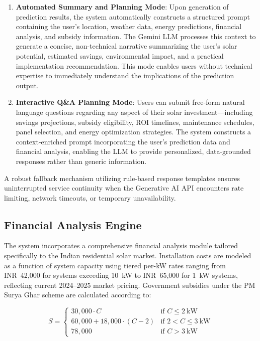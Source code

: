\documentclass[conference]{IEEEtran}
\begin{document}
\begin{enumerate}
\item \textbf{Automated Summary and Planning Mode}: Upon generation of prediction results, the system automatically constructs a structured prompt containing the user's location, weather data, energy predictions, financial analysis, and subsidy information. The Gemini LLM processes this context to generate a concise, non-technical narrative summarizing the user's solar potential, estimated savings, environmental impact, and a practical implementation recommendation. This mode enables users without technical expertise to immediately understand the implications of the prediction output.

\item \textbf{Interactive Q\&A Planning Mode}: Users can submit free-form natural language questions regarding any aspect of their solar investment---including savings projections, subsidy eligibility, ROI timelines, maintenance schedules, panel selection, and energy optimization strategies. The system constructs a context-enriched prompt incorporating the user's prediction data and financial analysis, enabling the LLM to provide personalized, data-grounded responses rather than generic information.
\end{enumerate}

A robust fallback mechanism utilizing rule-based response templates ensures uninterrupted service continuity when the Generative AI API encounters rate limiting, network timeouts, or temporary unavailability.

\subsection{Financial Analysis Engine}

The system incorporates a comprehensive financial analysis module tailored specifically to the Indian residential solar market. Installation costs are modeled as a function of system capacity using tiered per-kW rates ranging from INR~42,000 for systems exceeding 10~kW to INR~65,000 for 1~kW systems, reflecting current 2024--2025 market pricing. Government subsidies under the PM Surya Ghar scheme are calculated according to:

\begin{equation}
S = \begin{cases}
30{,}000 \cdot C & \text{if } C \leq 2~\text{kW} \\
60{,}000 + 18{,}000 \cdot (C - 2) & \text{if } 2 < C \leq 3~\text{kW} \\
78{,}000 & \text{if } C > 3~\text{kW}
\end{cases}
\label{eq:subsidy}
\end{equation}
\end{document}
